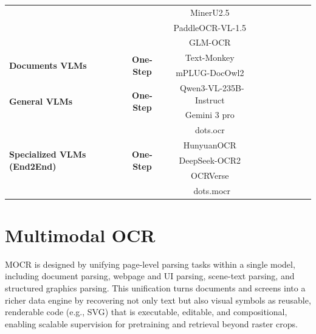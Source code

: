 \documentclass{article}
\newcommand{\cmark}{\ding{51}}
\newcommand{\xmark}{\ding{55}}
\newcommand{\pmark}{\raisebox{0.15em}{\scriptsize$\triangle$}}
\begin{document}
\begin{table}[!t]
{\begin{tabular}{l|cc|cccccc}
            &&MinerU2.5~\cite{niu2025mineru2}& \cmark&\cmark& \xmark& \xmark & \xmark & \xmark
            \\
            &&PaddleOCR-VL-1.5~\cite{cui2026paddleocr}& \cmark&\cmark& \xmark& \xmark & \xmark & \xmark
            \\
 & & GLM-OCR~\cite{duan2026glmocrtechnicalreport}& \cmark& \cmark& \xmark& \xmark & \cmark&\xmark
\\
            \midrule
            \multirow{2}{*}{\parbox{1.6cm}{\centering \textbf{Documents VLMs}}}&
            \multirow{2}{*}{\parbox{1.6cm}{\centering \textbf{One-Step}}}&
            Text-Monkey~\cite{liu2026textmonkey}& \xmark&\xmark & \cmark & \cmark & \cmark & \xmark
            \\
            &&mPLUG-DocOwl2~\cite{hu2025mplug}& \xmark&\cmark & \cmark & \cmark & \cmark & \xmark
            \\
            \midrule
            \multirow{2}{*}{\parbox{1.6cm}{\centering \textbf{General VLMs}}}&\multirow{2}{*}{\parbox{1.6cm}{\centering \textbf{One-Step}}}&Qwen3-VL-235B-Instruct~\cite{bai2025qwen3}& \cmark&\cmark & \cmark & \cmark & \cmark & \pmark
            \\
            &&Gemini 3 pro~\cite{google2025gemini3} & \cmark&\cmark & \cmark & \cmark & \cmark & \pmark
            \\
            \midrule
            \multirow{5}{*}{\parbox{1.6cm}{\centering \textbf{Specialized VLMs (End2End)}}}&
            \multirow{5}{*}{\parbox{1.6cm}{\centering \textbf{One-Step}}}
            &dots.ocr~\cite{li2025dots}& \cmark&\cmark& \xmark& \xmark & \xmark & \xmark
            \\
            &&HunyuanOCR~\cite{team2025hunyuanocr}& \xmark&\cmark & \cmark & \cmark & \cmark & \xmark\\
            &&DeepSeek-OCR2~\cite{wei2026deepseek}& \cmark&\cmark& \xmark& \xmark& \xmark& \xmark\\
            & & OCRVerse~\cite{zhong2026ocrverse}& \xmark & \cmark & \xmark& \xmark& \xmark&\pmark
\\
             & & dots.mocr&             \cmark & \cmark & \cmark & \cmark & \cmark &\cmark
\\
            \bottomrule
        \end{tabular}}
    \label{tab:pipeline-comparion}
\end{table}

\section{Multimodal OCR}
\label{sec:method}
    MOCR is designed by unifying page-level parsing tasks within a single model, including document parsing, webpage and UI parsing, scene-text parsing, and structured graphics parsing. This unification turns documents and screens into a richer data engine by recovering not only text but also visual symbols as reusable, renderable code (e.g., SVG) that is executable, editable, and compositional, enabling scalable supervision for pretraining and retrieval beyond raster crops.
\end{document}
